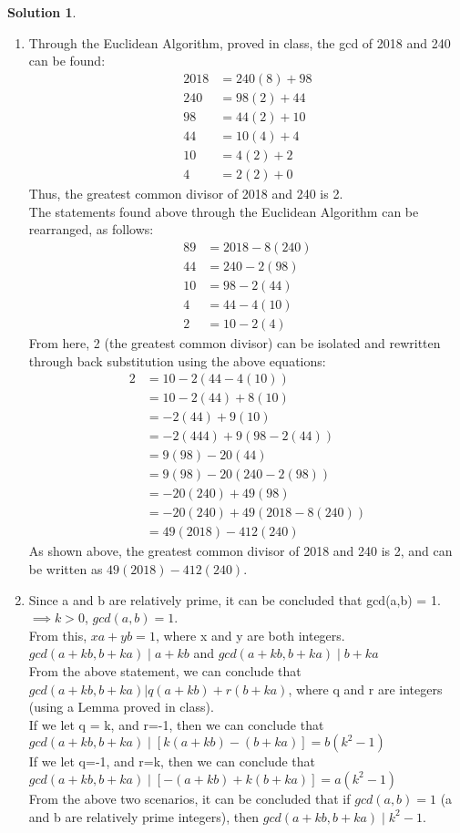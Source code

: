 \documentclass{article}
\theoremstyle{definition}
\newtheorem*{solution}{Solution}
\begin{document}
\begin{solution}

\begin{enumerate}[label=\alph*)]
\item
Through the Euclidean Algorithm, proved in class, the gcd of 2018 and 240 can be found:
\begin{align*}
    2018&=240(8)+98\\
    240&=98(2)+44\\
    98&=44(2)+10\\
    44&=10(4)+4\\
    10&=4(2)+2\\
    4&=2(2)+0
\end{align*}
Thus, the greatest common divisor of 2018 and 240 is 2.\\
The statements found above through the Euclidean Algorithm can be rearranged, as follows:
\begin{align*}
    89&=2018-8(240)\\
    44&=240-2(98)\\
    10&=98-2(44)\\
    4&=44-4(10)\\
    2&=10-2(4)
\end{align*}
From here, 2 (the greatest common divisor) can be isolated and rewritten through back substitution using the above equations:
\begin{align*}
    2&=10-2(44-4(10))\\
    &=10-2(44)+8(10)\\
    &=-2(44)+9(10)\\
    &=-2(444)+9(98-2(44))\\
    &=9(98)-20(44)\\
    &=9(98)-20(240-2(98))\\
    &=-20(240)+49(98)\\
    &=-20(240)+49(2018-8(240))\\
    &=49(2018)-412(240)
\end{align*}
As shown above, the greatest common divisor of 2018 and 240 is 2, and can be written as $49(2018)-412(240)$.

\item
Since a and b are relatively prime, it can be concluded that gcd(a,b) = 1. $\implies k>0$, $gcd(a,b)=1$.\\
From this, $xa+yb=1$, where x and y are both integers.\\
$gcd(a+kb, b+ka) \mid a+kb$ and $gcd(a+kb, b+ka) \mid b+ka$\\
From the above statement, we can conclude that $gcd(a+kb, b+ka) | q(a+kb) + r(b+ka)$, where q and r are integers (using a Lemma proved in class).\\
If we let q = k, and r=-1, then we can conclude that $gcd(a+kb, b+ka) \mid [k(a+kb)-(b+ka)]=b(k^2-1)$\\
If we let q=-1, and r=k, then we can conclude that $gcd(a+kb, b+ka) \mid [-(a+kb)+k(b+ka)]=a(k^2-1)$\\
From the above two scenarios, it can be concluded that if $gcd(a,b)=1$ (a and b are relatively prime integers), then $gcd(a+kb, b+ka) \mid k^2-1$.


\end{enumerate}
\end{solution}
\end{document}
